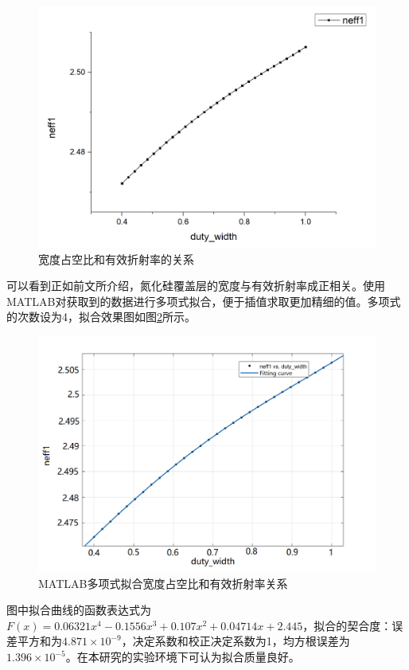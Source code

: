 \documentclass[UTF8,a4paper,12pt]{ctexart}
\numberwithin{equation}{section}
\begin{document}
\begin{figure}[htbp]
\centering
\includegraphics[width=0.8\linewidth]{fig23.png}
\caption{宽度占空比和有效折射率的关系}
\label{3-19}
\end{figure}



可以看到正如前文所介绍，氮化硅覆盖层的宽度与有效折射率成正相关。使用MATLAB对获取到的数据进行多项式拟合，便于插值求取更加精细的值。多项式的次数设为4，拟合效果图如图\ref{3-20}所示。

\begin{figure}[htbp]
\centering
\includegraphics[width=0.8\linewidth]{fig24.png}
\caption{MATLAB多项式拟合宽度占空比和有效折射率关系}
\label{3-20}
\end{figure}

图中拟合曲线的函数表达式为$F(x)=0.06321x^4-0.1556x^3+0.107x^2+0.04714x+2.445$，拟合的契合度：误差平方和为$4.871\times 10^{-9}$，决定系数和校正决定系数为1，均方根误差为$1.396\times 10^{-5}$。在本研究的实验环境下可认为拟合质量良好。
\end{document}
